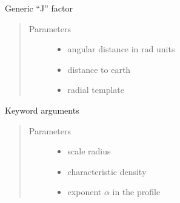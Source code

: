 \documentclass[letterpaper,10pt,english]{sphinxmanual}
\begin{document}

\begin{fulllineitems}
\label{\detokenize{diffsph.profiles:diffsph.profiles.hfactors.J_factor}}
\sphinxAtStartPar
Generic “J” factor
\begin{quote}\begin{description}
\item[{Parameters}] \leavevmode\begin{itemize}
\item {} 
\sphinxAtStartPar
{} \textendash{} angular distance in rad units

\item {} 
\sphinxAtStartPar
{} \textendash{} distance to earth

\item {} 
\sphinxAtStartPar
{} \textendash{} radial template

\end{itemize}

\end{description}\end{quote}

\sphinxAtStartPar
Keyword arguments
\begin{quote}\begin{description}
\item[{Parameters}] \leavevmode\begin{itemize}
\item {} 
\sphinxAtStartPar
{} \textendash{} scale radius

\item {} 
\sphinxAtStartPar
{} \textendash{} characteristic density

\item {} 
\sphinxAtStartPar
{} \textendash{} exponent \(\alpha\) in the {\hyperref[\detokenize{diffsph.profiles:diffsph.profiles.templates.hdz}]{}} profile


\end{itemize}
\end{description}
\end{quote}
\end{fulllineitems}
\end{document}
